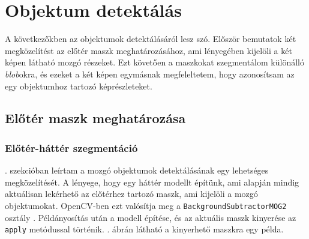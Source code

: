 \section{Objektum detektálás}

A következőkben az objektumok detektálásáról lesz szó. Először bemutatok két megközelítést az előtér maszk meghatározásához, ami lényegében kijelöli a két képen látható mozgó részeket. Ezt követően a maszkokat szegmentálom különálló \textit{blob}okra, és ezeket a két képen egymásnak megfeleltetem, hogy azonosítsam az egy objektumhoz tartozó képrészleteket.

    \subsection{Előtér maszk meghatározása}


\subsubsection{Előtér-háttér szegmentáció}

. szekcióban leírtam a mozgó objektumok detektálásának egy lehetséges megközelítését. A lényege, hogy egy háttér modellt építünk, ami alapján mindig aktuálisan lekérhető az előtérhez tartozó maszk, ami kijelöli a mozgó objektumokat. OpenCV-ben ezt valósítja meg a \texttt{BackgroundSubtractorMOG2} osztály \cite{opencv-mog}. Példányosítás után a modell építése, és az aktuális maszk kinyerése az \texttt{apply} metódussal történik. . ábrán látható a kinyerhető maszkra egy példa.

